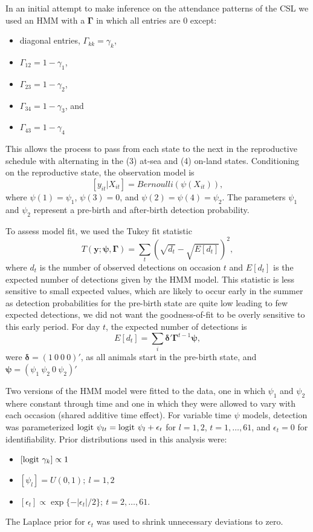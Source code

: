 \documentclass[12pt,english]{article}
\begin{document}
\begin{spacing}{1.9}
In an initial attempt to make inference on the attendance patterns of the CSL we used an HMM with a $\boldsymbol{\Gamma}$ in which all entries are 0 except:
\begin{itemize}
\item diagonal entries, $\Gamma_{kk} = \gamma_k$, 
\item $\Gamma_{12} = 1-\gamma_1$,
\item $\Gamma_{23} = 1-\gamma_2$,
\item $\Gamma_{34} = 1-\gamma_3$, and 
\item $\Gamma_{43} = 1-\gamma_4$
\end{itemize}
 This allows the process to pass from each state to the next in the reproductive schedule with alternating in the (3) at-sea and (4) on-land states. Conditioning on the reproductive state, the observation model is
 $$
 [y_{it}|X_{it}] = Bernoulli(\psi(X_{it})),
 $$
 where $\psi(1) = \psi_1$, $\psi(3) = 0$, and $\psi(2) = \psi(4) = \psi_2$. The parameters $\psi_1$ and $\psi_2$ represent a pre-birth and after-birth detection probability. 
 
 To assess model fit, we used the Tukey fit statistic 
 \begin{equation}
 T(\mathbf{y}; \boldsymbol{\psi},\boldsymbol{\Gamma}) =  \sum_t\left(\sqrt{d_t} - \sqrt{E[d_t]}\right)^2,
 \end{equation} 
 where $d_t$ is the number of observed detections on occasion $t$ and $E[d_t]$ is the expected number of detections given by the HMM model. This statistic is less sensitive to small expected values, which are likely to occur early in the summer as detection probabilities for the pre-birth state are quite low leading to few expected detections, we did not want the goodness-of-fit to be overly sensitive to this early period. For day $t$, the expected number of detections is
 \begin{equation}
 E[d_t] = \sum_i  \boldsymbol{\delta}'\boldsymbol{\Gamma}^{t-1}\boldsymbol{\psi},
 \end{equation}
 were $\boldsymbol{\delta} = (1\ 0\ 0\ 0)'$, as all animals start in the pre-birth state, and $\boldsymbol{\psi} = (\psi_1\ \psi_2\ 0\ \psi_2)'$
 
 Two versions of the HMM model were fitted to the data, one in which $\psi_1$ and $\psi_2$ where constant through time and one in which they were allowed to vary with each occasion (shared additive time effect). For variable time $\psi$ models, detection was parameterized ${\rm logit}\ \psi_{lt} = \mbox{logit } \psi_l + \epsilon_t$ for $l=1,2$, $t=1,\dots,61$, and $\epsilon_t = 0$ for identifiability. Prior distributions used in this analysis were:
 \begin{itemize}
 \item $[{\rm logit}\ \gamma_k] \propto 1$
 \item $[\psi_l] = U(0,1);\ l=1,2$
 \item $[\epsilon_t] \propto \exp\{-|\epsilon_t|/2\};\ t=2,\dots,61$.
 \end{itemize} 
  The Laplace prior for $\epsilon_t$ was used to shrink unnecessary deviations to zero. 
  

\end{spacing}
\end{document}
